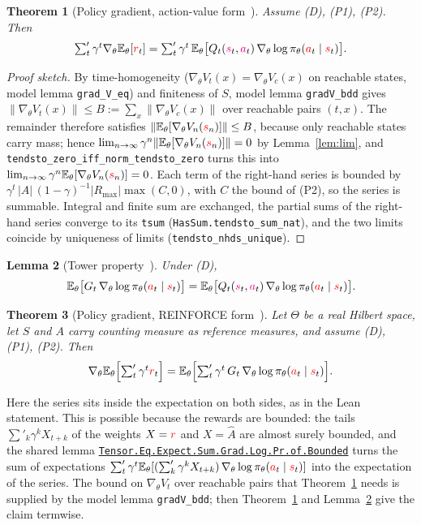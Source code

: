 \documentclass[11pt,a4paper]{article}
\newcommand{\lmod}[1]{\href{http://www.lemma.cn/lean/?module=#1}{\nolinkurl{#1}}}
\newtheorem{theorem}{Theorem}[section]
\newtheorem{lemma}[theorem]{Lemma}
\newcommand{\E}{\mathbb{E}}
\newcommand{\rv}[1]{{\color{red}#1}}       %
\newcommand{\ra}[1]{{\color{magenta}#1}}   %
\newcommand{\sv}{\rv{s}}
\newcommand{\av}{\rv{a}}
\newcommand{\rw}{\rv{r}}
\newcommand{\grad}{\nabla_{\theta}}
\newcommand{\tsum}{\textstyle\sum'}
\begin{document}
\begin{theorem}[Policy gradient, action-value form~\cite{lemma_pgq}]
\label{thm:pgq}
Assume (D), (P1), (P2).
Then
\[
\tsum_t\gamma^t\grad\E_\theta[\rw_t]=\tsum_t\gamma^t\,\E_\theta\bigl[Q_t(\ra{s}_t,\ra{a}_t)\,\grad\log\pi_\theta(\av_t\mid\sv_t)\bigr].
\]
\end{theorem}
\begin{proof}[Proof sketch]
By time-homogeneity ($\grad V_t(x)=\grad V_c(x)$ on reachable states, model lemma \texttt{grad\_V\_eq}) and finiteness of $S$, model lemma \texttt{gradV\_bdd} gives $\|\grad V_t(x)\|\le B:=\sum_x\|\grad V_c(x)\|$ over reachable pairs $(t,x)$. The remainder therefore satisfies $\|\E_\theta[\grad V_n(\sv_n)]\|\le B$, because only reachable states carry mass; hence $\lim_{n\to\infty}\gamma^n\|\E_\theta[\grad V_n(\sv_n)]\|=0$ by Lemma~\ref{lem:lim}, and \texttt{tendsto\_zero\_iff\_norm\_tendsto\_zero} turns this into $\lim_{n\to\infty}\gamma^n\E_\theta[\grad V_n(\sv_n)]=0$.
Each term of the right-hand series is bounded by $\gamma^t\,|A|\,(1-\gamma)^{-1}|R_{\max}|\max(C,0)$, with $C$ the bound of (P2), so the series is summable.
Integral and finite sum are exchanged, the partial sums of the right-hand series converge to its \texttt{tsum} (\texttt{HasSum.tendsto\_sum\_nat}), and the two limits coincide by uniqueness of limits (\texttt{tendsto\_nhds\_unique}).
\end{proof}

\begin{lemma}[Tower property~\cite{lemma_tower}]
\label{lem:tower}
Under (D),
\[
\E_\theta\bigl[G_t\,\grad\log\pi_\theta(\av_t\mid\sv_t)\bigr]=\E_\theta\bigl[Q_t(\ra{s}_t,\ra{a}_t)\,\grad\log\pi_\theta(\av_t\mid\sv_t)\bigr].
\]
\end{lemma}

\begin{theorem}[Policy gradient, REINFORCE form~\cite{lemma_pgt}]
\label{thm:pgt}
Let $\Theta$ be a real Hilbert space, let $S$ and $A$ carry counting measure as reference measures, and assume (D), (P1), (P2).
Then
\[
\grad\E_\theta\Bigl[\tsum_t\gamma^t\rw_t\Bigr]=\E_\theta\Bigl[\tsum_t\gamma^t\,G_t\,\grad\log\pi_\theta(\av_t\mid\sv_t)\Bigr].
\]
\end{theorem}
Here the series sits inside the expectation on both sides, as in the Lean statement.
This is possible because the rewards are bounded: the tails $\tsum_k\gamma^kX_{t+k}$ of the weights $X=\rw$ and $X=\hat A$ are almost surely bounded, and the shared lemma \lmod{Tensor.Eq.Expect.Sum.Grad.Log.Pr.of.Bounded} turns the sum of expectations $\tsum_t\gamma^t\E_\theta[(\tsum_k\gamma^kX_{t+k})\,\grad\log\pi_\theta(\av_t\mid\sv_t)]$ into the expectation of the series.
The bound on $\grad V_t$ over reachable pairs that Theorem~\ref{thm:pgq} needs is supplied by the model lemma \texttt{gradV\_bdd}; then Theorem~\ref{thm:pgq} and Lemma~\ref{lem:tower} give the claim termwise.
\end{document}
